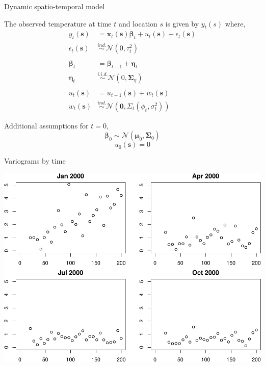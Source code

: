 \documentclass[11pt,ignorenonframetext,]{beamer}
\begin{document}
\begin{frame}{Dynamic spatio-temporal model}
\protect\hypertarget{dynamic-spatio-temporal-model}{}

\vspace{2mm}

The observed temperature at time \(t\) and location \(s\) is given by
\(y_t(s)\) where, \footnotesize \[
\begin{aligned}
y_t(\symbf{s}) & = \symbf{x}_t(\symbf{s})\symbf{\beta}_t + u_t(\symbf{s}) + \epsilon_t(\symbf{s}) \\
\epsilon_t(\symbf{s}) &\stackrel{ind.}\sim \mathcal{N}(0,\tau_{t}^2) \\
\\
\symbf{\beta}_t & = \symbf{\beta}_{t-1} + \symbf{\eta}_t \\
\symbf{\eta}_t &\stackrel{i.i.d.}\sim \mathcal{N}(0,\symbf{\Sigma}_{\eta}) \\
\\
u_t(\symbf{s}) &= u_{t-1}(\symbf{s}) + w_t(\symbf{s}) \\
w_t(\symbf{s}) &\stackrel{ind.}{\sim} \mathcal{N}\left(\symbf{0}, \Sigma_t(\phi_t, \sigma^2_t)\right)
\end{aligned}
\]

\vspace{3mm}

\pause

\normalsize

Additional assumptions for \(t=0\), \footnotesize \[
\symbf{\beta}_{0} \sim \mathcal{N}(\symbf{\mu}_0, \symbf{\Sigma}_0)
\] \[
u_{0}(\symbf{s}) = 0
\]

\end{frame}

\begin{frame}{Variograms by time}
\protect\hypertarget{variograms-by-time}{}

\begin{center}\includegraphics[width=\textwidth]{Lec22_files/figure-beamer/unnamed-chunk-4-1} \end{center}

\end{frame}
\end{document}

